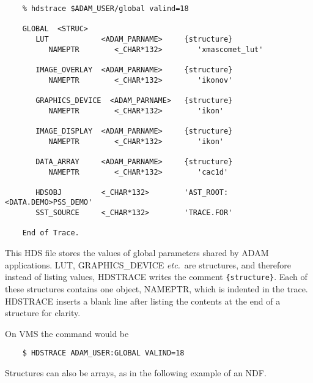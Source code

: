 \small
\begin{verbatim}
    % hdstrace $ADAM_USER/global valind=18 
  
    GLOBAL  <STRUC>
       LUT            <ADAM_PARNAME>     {structure}
          NAMEPTR        <_CHAR*132>        'xmascomet_lut' 

       IMAGE_OVERLAY  <ADAM_PARNAME>     {structure} 
          NAMEPTR        <_CHAR*132>        'ikonov' 

       GRAPHICS_DEVICE  <ADAM_PARNAME>   {structure}
          NAMEPTR        <_CHAR*132>        'ikon' 

       IMAGE_DISPLAY  <ADAM_PARNAME>     {structure}
          NAMEPTR        <_CHAR*132>        'ikon' 

       DATA_ARRAY     <ADAM_PARNAME>     {structure}
          NAMEPTR        <_CHAR*132>        'cac1d' 

       HDSOBJ         <_CHAR*132>        'AST_ROOT:<DATA.DEMO>PSS_DEMO' 
       SST_SOURCE     <_CHAR*132>        'TRACE.FOR' 
                                                                             
    End of Trace.
\end{verbatim}
\normalsize

This HDS file stores the values of global parameters shared by ADAM
applications.  LUT, GRAPHICS\_DEVICE {\it etc.}\ are structures, and
therefore instead of listing values, {\footnotesize HDSTRACE} writes the
comment {\tt \{structure\}}.  Each of these structures contains one
object, NAMEPTR, which is indented in the trace.  {\footnotesize HDSTRACE} inserts
a blank line after listing the contents at the end of a structure for
clarity. 

On VMS the command would be

\small
\begin{verbatim}
    $ HDSTRACE ADAM_USER:GLOBAL VALIND=18 
\end{verbatim}
\normalsize
Structures can also be arrays, as in the following example of an NDF.

